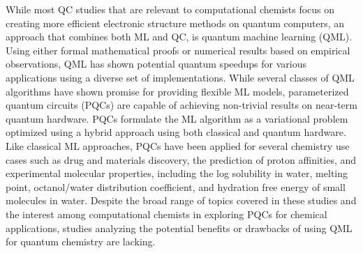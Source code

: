 \documentclass[journal=jacsat,manuscript=article]{achemso}
\begin{document}
While most QC studies that are relevant to computational chemists focus on creating more efficient electronic structure methods on quantum computers\cite{romero_strategies_2019,mcardle_quantum_2020,bauer_quantum_2020,cao_quantum_2019}, an approach that combines both ML and QC, is quantum machine learning (QML).
Using either formal mathematical proofs or numerical results based on empirical observations, QML has shown potential quantum speedups for various applications using a diverse set of implementations.\cite{biamonte_quantum_2017}
While several classes of QML algorithms have shown promise for providing flexible ML models, parameterized quantum circuits (PQCs) are capable of achieving non-trivial results on near-term quantum hardware.
PQCs formulate the ML algorithm as a variational problem optimized using a hybrid approach using both classical and quantum hardware.\cite{benedetti_parameterized_2019}
Like classical ML approaches, PQCs have been applied for several chemistry use cases such as drug\cite{suzuki_predicting_2020,smaldone_quantum--classical_2024,bhatia_quantum_2023,kao_exploring_2023,li_quantum_2021,avramouli_quantum_2023,avramouli_unlocking_2023} and materials discovery\cite{ishiyama_noise-robust_2022,ryu_quantum_2023,vitz_hybrid_2024}, the prediction of proton affinities\cite{jin_integrating_2025}, and experimental molecular properties, including the log solubility in water, melting point, octanol/water distribution coefficient, and hydration free energy of small molecules in water.\cite{hatakeyama-sato_quantum_2023}
Despite the broad range of topics covered in these studies and the interest among computational chemists in exploring PQCs for chemical applications, studies analyzing the potential benefits or drawbacks of using QML for quantum chemistry are lacking. 
\end{document}
